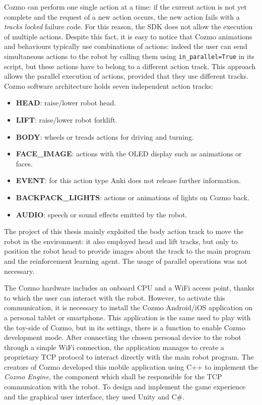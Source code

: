 Cozmo can perform one single action at a time: if the current action is not yet complete and the request of a new action occurs, the new action fails with a \textit{tracks locked} failure code.
For this reason, the SDK does not allow the execution of multiple actions.
Despite this fact, it is easy to notice that Cozmo animations and behaviours typically use combinations of actions: indeed the user can send simultaneous actions to the robot by calling them using \texttt{in\_parallel=True} in its script, but these actions have to belong to a different action track.
This approach allows the parallel execution of actions, provided that they use different tracks.
Cozmo software architecture holds seven independent action tracks:

\begin{itemize}
	\item \textbf{HEAD}: raise/lower robot head.
	\item \textbf{LIFT}: raise/lower robot forklift.
	\item \textbf{BODY}: wheels or treads actions for driving and turning.
	\item \textbf{FACE\_IMAGE}: actions with the OLED display such as animations or faces.
	\item \textbf{EVENT}: for this action type Anki does not release further information.
	\item \textbf{BACKPACK\_LIGHTS}: actions or animations of lights on Cozmo back.
	\item \textbf{AUDIO}: speech or sound effects emitted by the robot.
\end{itemize}

The project of this thesis mainly exploited the body action track to move the robot in the environment: it also employed head and lift tracks, but only to position the robot head to provide images about the track to the main program and the reinforcement learning agent.
The usage of parallel operations was not necessary.

The Cozmo hardware includes an onboard CPU and a WiFi access point, thanks to which the user can interact with the robot.
However, to activate this communication, it is necessary to install the Cozmo Android/iOS application on a personal tablet or smartphone.
This application is the same used to play with the toy-side of Cozmo, but in its settings, there is a function to enable Cozmo development mode.
After connecting the chosen personal device to the robot through a simple WiFi connection, the application manages to create a proprietary TCP protocol to interact directly with the main robot program.
The creators of Cozmo developed this mobile application using C++ to implement the \textit{Cozmo Engine}, the component which shall be responsible for the TCP communication with the robot.
To design and implement the game experience and the graphical user interface, they used Unity and C\#.

